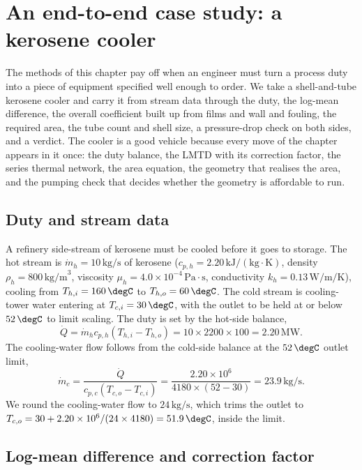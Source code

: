 \section{An end-to-end case study: a kerosene cooler}

The methods of this chapter pay off when an engineer must turn a process
duty into a piece of equipment specified well enough to order. We take a
shell-and-tube kerosene cooler and carry it from stream data through the
duty, the log-mean difference, the overall coefficient built up from
films and wall and fouling, the required area, the tube count and shell
size, a pressure-drop check on both sides, and a verdict. The cooler is
a good vehicle because every move of the chapter appears in it once: the
duty balance, the LMTD with its correction factor, the series thermal
network, the area equation, the geometry that realises the area, and the
pumping check that decides whether the geometry is affordable to run.

\subsection{Duty and stream data}

A refinery side-stream of kerosene must be cooled before it goes to
storage. The hot stream is $\dot{m}_h = 10\,\text{kg/s}$ of kerosene
($c_{p,h} = 2.20\,\text{kJ}/(\text{kg}\cdot\si{\kelvin})$, density
$\rho_h = 800\,\text{kg/m}^3$, viscosity $\mu_h = 4.0\times 10^{-4}\,
\text{Pa}\cdot\text{s}$, conductivity $k_h = 0.13\,\si{\watt\per\meter
\per\kelvin}$), cooling from $T_{h,i} = 160\,\degC$ to $T_{h,o} = 60\,
\degC$. The cold stream is cooling-tower water entering at $T_{c,i} =
30\,\degC$, with the outlet to be held at or below $52\,\degC$ to limit
scaling. The duty is set by the hot-side balance,
\[
\dot{Q} = \dot{m}_h c_{p,h}(T_{h,i} - T_{h,o}) = 10 \times 2200 \times
100 = 2.20\,\text{MW}.
\]
The cooling-water flow follows from the cold-side balance at the
$52\,\degC$ outlet limit,
\[
\dot{m}_c = \frac{\dot{Q}}{c_{p,c}(T_{c,o} - T_{c,i})} = \frac{2.20
\times 10^6}{4180 \times (52 - 30)} = 23.9\,\text{kg/s}.
\]
We round the cooling-water flow to $24\,\text{kg/s}$, which trims the
outlet to $T_{c,o} = 30 + 2.20\times 10^6/(24\times 4180) = 51.9\,\degC$,
inside the limit.

\subsection{Log-mean difference and correction factor}

